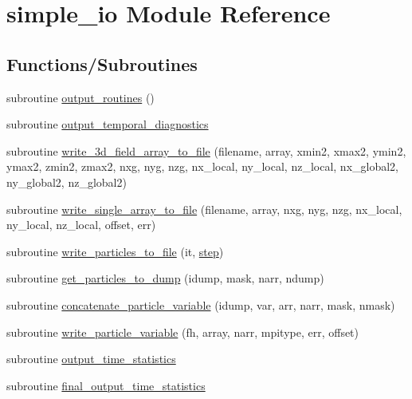 \hypertarget{namespacesimple__io}{}\section{simple\+\_\+io Module Reference}
\label{namespacesimple__io}
\subsection*{Functions/\+Subroutines}
\begin{DoxyCompactItemize}
\item 
subroutine \hyperlink{namespacesimple__io_afa460efbda992ca175d786f86ab09ee9}{output\+\_\+routines} ()
\item 
subroutine \hyperlink{namespacesimple__io_acb0fc119c4f9a03b88d4129ec0036e1c}{output\+\_\+temporal\+\_\+diagnostics}
\item 
subroutine \hyperlink{namespacesimple__io_a2100e8a4cfe3bc3c9e2dcc93988d6551}{write\+\_\+3d\+\_\+field\+\_\+array\+\_\+to\+\_\+file} (filename, array,                                                               xmin2, xmax2, ymin2, ymax2, zmin2, zmax2, nxg, nyg, nzg, nx\+\_\+local,                                               ny\+\_\+local, nz\+\_\+local, nx\+\_\+global2, ny\+\_\+global2, nz\+\_\+global2)
\item 
subroutine \hyperlink{namespacesimple__io_a506cc0f775048e27bb5ccd9e936592d3}{write\+\_\+single\+\_\+array\+\_\+to\+\_\+file} (filename, array, nxg, nyg, nzg, nx\+\_\+local, ny\+\_\+local, nz\+\_\+local, offset, err)
\item 
subroutine \hyperlink{namespacesimple__io_a02b043d1424f1b2d25e47a55e697a5aa}{write\+\_\+particles\+\_\+to\+\_\+file} (it, \hyperlink{submain_8_f90_ae0a3ce7909f5d34b3684e226b780a075}{step})
\item 
subroutine \hyperlink{namespacesimple__io_abb3c1220ac70ea28fcbce1cd9c03b294}{get\+\_\+particles\+\_\+to\+\_\+dump} (idump, mask, narr, ndump)
\item 
subroutine \hyperlink{namespacesimple__io_a97c3b871fecd4b1341301fa6cf00a8fa}{concatenate\+\_\+particle\+\_\+variable} (idump, var, arr, narr, mask, nmask)
\item 
subroutine \hyperlink{namespacesimple__io_aad8ee8298c20d69fabcd6eb5a8b7b620}{write\+\_\+particle\+\_\+variable} (fh, array, narr, mpitype, err, offset)
\item 
subroutine \hyperlink{namespacesimple__io_a87d8855ebcd3134e3cfaeb7f6c548249}{output\+\_\+time\+\_\+statistics}
\item 
subroutine \hyperlink{namespacesimple__io_a4f7eec6a6854f8127e7bfdfa307d7bb9}{final\+\_\+output\+\_\+time\+\_\+statistics}
\end{DoxyCompactItemize}


